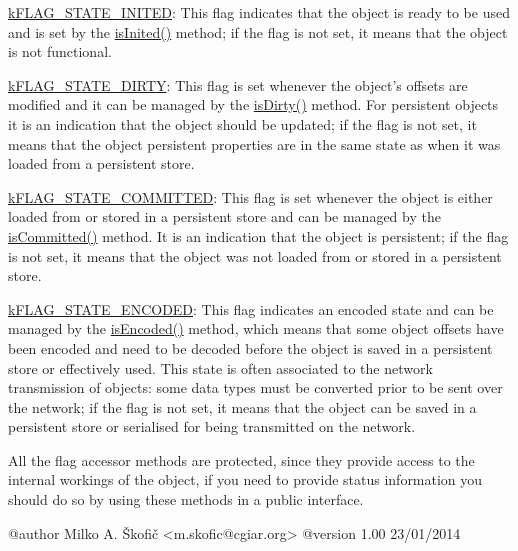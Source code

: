\begin{DoxyItemize}
\item {\ttfamily \hyperlink{}{k\-F\-L\-A\-G\-\_\-\-S\-T\-A\-T\-E\-\_\-\-I\-N\-I\-T\-E\-D}}\-: This flag indicates that the object is ready to be used and is set by the \hyperlink{namespace_ontology_wrapper_1_1traits_a43007c8c10e6a39efb3fda133acd66a5}{is\-Inited()} method; if the flag is not set, it means that the object is not functional. 
\item {\ttfamily \hyperlink{}{k\-F\-L\-A\-G\-\_\-\-S\-T\-A\-T\-E\-\_\-\-D\-I\-R\-T\-Y}}\-: This flag is set whenever the object's offsets are modified and it can be managed by the \hyperlink{namespace_ontology_wrapper_1_1traits_ab3e0667a6043c3358abbde6f4d961f74}{is\-Dirty()} method. For persistent objects it is an indication that the object should be updated; if the flag is not set, it means that the object persistent properties are in the same state as when it was loaded from a persistent store. 
\item {\ttfamily \hyperlink{}{k\-F\-L\-A\-G\-\_\-\-S\-T\-A\-T\-E\-\_\-\-C\-O\-M\-M\-I\-T\-T\-E\-D}}\-: This flag is set whenever the object is either loaded from or stored in a persistent store and can be managed by the \hyperlink{namespace_ontology_wrapper_1_1traits_a36786d51cf29964961c7adf9ef4217ea}{is\-Committed()} method. It is an indication that the object is persistent; if the flag is not set, it means that the object was not loaded from or stored in a persistent store. 
\item {\ttfamily \hyperlink{}{k\-F\-L\-A\-G\-\_\-\-S\-T\-A\-T\-E\-\_\-\-E\-N\-C\-O\-D\-E\-D}}\-: This flag indicates an encoded state and can be managed by the \hyperlink{namespace_ontology_wrapper_1_1traits_a089fd27758be34a128040793eab24d17}{is\-Encoded()} method, which means that some object offsets have been encoded and need to be decoded before the object is saved in a persistent store or effectively used. This state is often associated to the network transmission of objects\-: some data types must be converted prior to be sent over the network; if the flag is not set, it means that the object can be saved in a persistent store or serialised for being transmitted on the network. 
\end{DoxyItemize}

All the flag accessor methods are protected, since they provide access to the internal workings of the object, if you need to provide status information you should do so by using these methods in a public interface. \begin{DoxyVerb} @author            Milko A. Škofič <m.skofic@cgiar.org>
 @version   1.00 23/01/2014\end{DoxyVerb}
 